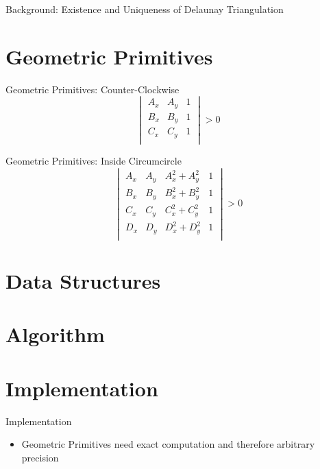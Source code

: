 \documentclass[aspectratio=169]{beamer}
\begin{document}
\begin{frame}{Background: Existence and Uniqueness of Delaunay Triangulation}
\end{frame}

\section{Geometric Primitives}
\begin{frame}{Geometric Primitives: Counter-Clockwise}
  \[
    \begin{vmatrix}
      A_x & A_y & 1 \\
      B_x & B_y & 1 \\
      C_x & C_y & 1 \\
    \end{vmatrix}
    > 0
  \]
\end{frame}

\begin{frame}{Geometric Primitives: Inside Circumcircle}
  \[
    \begin{vmatrix}
      A_x & A_y & A_x^2 + A_y^2 & 1 \\
      B_x & B_y & B_x^2 + B_y^2 & 1 \\
      C_x & C_y & C_x^2 + C_y^2 & 1 \\
      D_x & D_y & D_x^2 + D_y^2 & 1 \\
    \end{vmatrix}
    > 0
  \]
\end{frame}

\section{Data Structures}

\section{Algorithm}

\section{Implementation}
\begin{frame}{Implementation}
  \begin{itemize}
    \item Geometric Primitives need exact computation and therefore arbitrary precision
  \end{itemize}
\end{frame}
\end{document}

